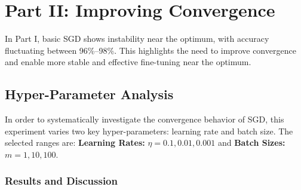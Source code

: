 \section{Part II: Improving Convergence}

In Part I, basic SGD shows instability near the optimum, with accuracy fluctuating between 96\%--98\%. This highlights the need to improve convergence and enable more stable and effective fine-tuning near the optimum.

\subsection{Hyper-Parameter Analysis}

In order to systematically investigate the convergence behavior of SGD, this experiment varies two key hyper-parameters: learning rate and batch size. The selected ranges are: \textbf{Learning Rates:} \( \eta = 0.1, 0.01, 0.001 \) and \textbf{Batch Sizes:} \( m = 1, 10, 100 \).

\subsubsection{Results and Discussion}

